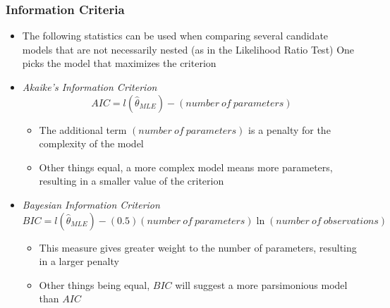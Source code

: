 \documentclass{beamer}
\begin{document}
\begin{frame}%
\frametitle{Information Criteria}
\begin{itemize}
\item The following statistics can be used when comparing several candidate models that are not necessarily nested (as in the Likelihood Ratio Test) One picks the model that maximizes the criterion %
\item \emph{Akaike's Information Criterion}
\begin{equation*}
AIC = l(\hat{\theta}_{MLE}) - (number~of~parameters)
\end{equation*}
\begin{itemize}\item The additional term $(number~of~parameters)$ is a penalty for the complexity of the model %
\item Other things equal, a more complex model means more parameters, resulting in a smaller value of the
criterion %
\end{itemize}
\item \emph{Bayesian Information Criterion}
\begin{equation*}
BIC = l(\hat{\theta}_{MLE}) - (0.5)(number~of~parameters)\ln
(number~of~observations)
\end{equation*} %
\begin{itemize}\item This measure gives greater weight to the number of
parameters, resulting in a larger penalty %

\item Other things being equal, $BIC$ will suggest a more parsimonious model than $AIC$
\end{itemize}
\end{itemize}
\end{frame}
\end{document}
